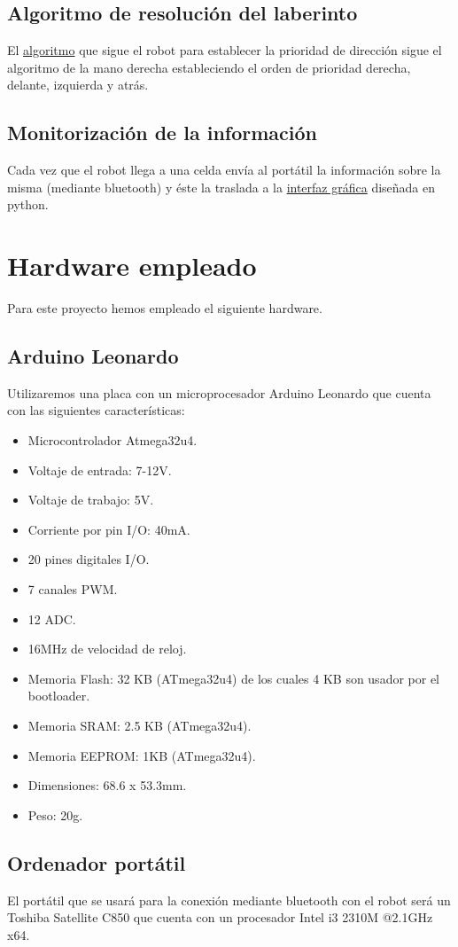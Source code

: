 \subsection{Algoritmo de resolución del laberinto}
El \hyperlink{laberinto}{algoritmo} que sigue el robot para establecer la prioridad de dirección sigue el algoritmo de la mano derecha estableciendo el orden de prioridad derecha, delante, izquierda y atrás.

\subsection{Monitorización de la información}
Cada vez que el robot llega a una celda envía al portátil la información sobre la misma (mediante bluetooth) y éste la traslada a la \hyperlink{Monitorizacion}{interfaz gráfica} diseñada en python.

\section{Hardware empleado}
Para este proyecto hemos empleado el siguiente hardware.
\subsection{Arduino Leonardo}
Utilizaremos una placa con un microprocesador Arduino Leonardo que cuenta con las siguientes características:
\begin{itemize}
	\item Microcontrolador Atmega32u4.
	\item Voltaje de entrada: 7-12V.
	\item Voltaje de trabajo: 5V.
	\item Corriente por pin I/O: 40mA.
	\item 20 pines digitales I/O.
	\item 7 canales PWM.
	\item 12 ADC.
	\item 16MHz de velocidad de reloj.
	\item Memoria Flash: 32 KB (ATmega32u4) de los cuales 4 KB son usador por el bootloader.
	\item Memoria SRAM: 2.5 KB (ATmega32u4).
	\item Memoria EEPROM: 1KB (ATmega32u4).
	\item Dimensiones: 68.6 x 53.3mm.
	\item Peso: 20g.
\end{itemize}
\subsection{Ordenador portátil}
El portátil que se usará para la conexión mediante bluetooth con el robot será un Toshiba Satellite C850 que cuenta con un procesador Intel i3 2310M @2.1GHz x64.
